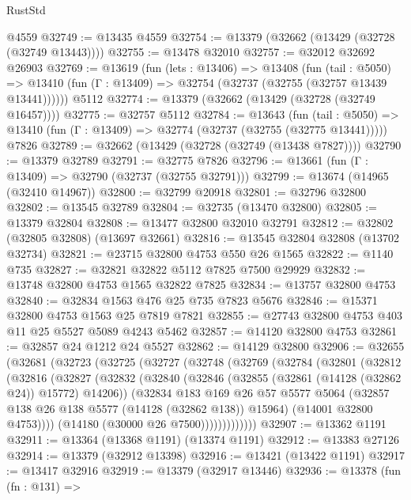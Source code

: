 \begin{lexlean}{RustStd}
\begin{coremodule}
    @4559
@32749 := @13435 @4559
@32754 := @13379 (@32662 (@13429 (@32728 (@32749 @13443))))
@32755 := @13478 @32010
@32757 := @32012 @32692 @26903
@32769 := @13619
    (fun (lets : @13406) =>
    @13408
      (fun (tail : @5050) =>
      @13410 (fun (Γ : @13409) => @32754 (@32737 (@32755 (@32757 @13439 @13441))))))
    @5112
@32774 := @13379 (@32662 (@13429 (@32728 (@32749 @16457))))
@32775 := @32757 @5112
@32784 := @13643
    (fun (tail : @5050) => @13410 (fun (Γ : @13409) => @32774 (@32737 (@32755 (@32775 @13441)))))
    @7826
@32789 := @32662 (@13429 (@32728 (@32749 (@13438 @7827))))
@32790 := @13379 @32789
@32791 := @32775 @7826
@32796 := @13661 (fun (Γ : @13409) => @32790 (@32737 (@32755 @32791)))
@32799 := @13674 (@14965 (@32410 @14967))
@32800 := @32799 @20918
@32801 := @32796 @32800
@32802 := @13545 @32789
@32804 := @32735 (@13470 @32800)
@32805 := @13379 @32804
@32808 := @13477 @32800 @32010 @32791
@32812 := @32802 (@32805 @32808) (@13697 @32661)
@32816 := @13545 @32804 @32808 (@13702 @32734)
@32821 := @23715 @32800 @4753 @550 @26 @1565
@32822 := @1140 @735
@32827 := @32821 @32822 @5112 @7825 @7500 @29929
@32832 := @13748 @32800 @4753 @1565 @32822 @7825
@32834 := @13757 @32800 @4753
@32840 := @32834 @1563 @476 @25 @735 @7823 @5676
@32846 := @15371 @32800 @4753 @1563 @25 @7819 @7821
@32855 := @27743 @32800 @4753 @403 @11 @25 @5527 @5089 @4243 @5462
@32857 := @14120 @32800 @4753
@32861 := @32857 @24 @1212 @24 @5527
@32862 := @14129 @32800
@32906 := @32655
    (@32681
      (@32723
        (@32725
          (@32727
            (@32748
              (@32769
                (@32784
                  (@32801
                    (@32812
                      (@32816
                        (@32827
                          (@32832
                            (@32840
                              (@32846 (@32855 (@32861 (@14128 (@32862 @24)) @15772) @14206))
                              (@32834
                                @183
                                @169
                                @26
                                @57
                                @5577
                                @5064
                                (@32857 @138 @26 @138 @5577 (@14128 (@32862 @138)) @15964)
                                (@14001 @32800 @4753))))
                          (@14180 (@30000 @26 @7500)))))))))))))
@32907 := @13362 @1191
@32911 := @13364 (@13368 @1191) (@13374 @1191)
@32912 := @13383 @27126
@32914 := @13379 (@32912 @13398)
@32916 := @13421 (@13422 @1191)
@32917 := @13417 @32916
@32919 := @13379 (@32917 @13446)
@32936 := @13378
    (fun (fn : @131) =>

\end{coremodule}
\end{lexlean}
